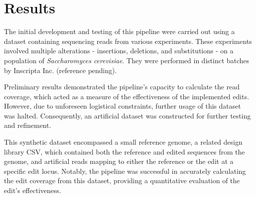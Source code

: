 \documentclass{bioinfo}
\theoremstyle{definition}
\begin{document}

\section*{Results}
\label{sec:results}

The initial development and testing of this pipeline were carried out using a dataset containing sequencing reads from various experiments. These experiments involved multiple alterations - insertions, deletions, and substitutions - on a population of \textit{Saccharomyces cerevisiae}. They were performed in distinct batches by Inscripta Inc. (reference pending).

Preliminary results demonstrated the pipeline's capacity to calculate the read coverage, which acted as a measure of the effectiveness of the implemented edits.
However, due to unforeseen logistical constraints, further usage of this dataset was halted. Consequently, an artificial dataset was constructed for further testing and refinement.

This synthetic dataset encompassed a small reference genome, a related design library CSV, which contained both the reference and edited sequences from the genome, and artificial reads mapping to either the reference or the edit at a specific edit locus. 
Notably, the pipeline was successful in accurately calculating the edit coverage from this dataset, providing a quantitative evaluation of the edit's effectiveness.
\end{document}
